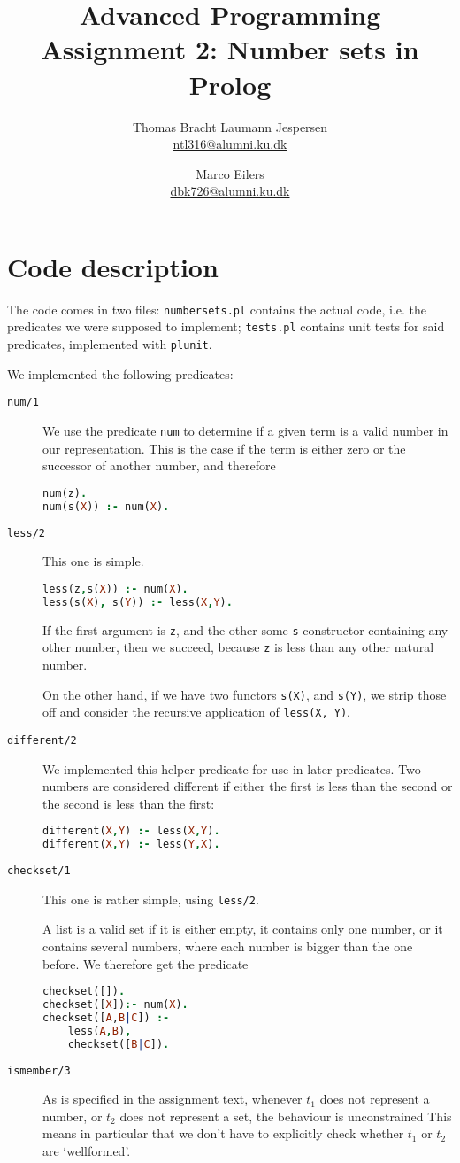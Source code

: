 \documentclass[a4paper]{article}
\title{Advanced Programming\\ Assignment 2: Number sets in Prolog}
\author{Thomas Bracht Laumann Jespersen\\ \url{ntl316@alumni.ku.dk} \and Marco Eilers\\ \url{dbk726@alumni.ku.dk} }
\newcommand{\pfuncn}[2]{\textnormal{\texttt{#1/#2}}\xspace}
\begin{document}
\maketitle
\section*{Code description}
The code comes in two files: \texttt{numbersets.pl} contains the actual code, i.e. the predicates we were supposed to implement; \texttt{tests.pl} contains unit tests for said predicates, implemented with \texttt{plunit}.

We implemented the following predicates:

\begin{description}
\item[\pfuncn{num}{1}] We use the predicate \texttt{num} to determine if a given term is a valid number in our representation. This is the case if the term is either zero or the successor of another number, and therefore
\begin{lstlisting}[language=prolog]
num(z).
num(s(X)) :- num(X).
\end{lstlisting}
\item[\pfuncn{less}{2}] This one is simple.
\begin{lstlisting}[language=prolog]
less(z,s(X)) :- num(X).
less(s(X), s(Y)) :- less(X,Y).
\end{lstlisting}
If the first argument is \texttt{z}, and the other some \texttt{s} constructor containing any other number, then we succeed, because \texttt{z} is less than any other natural number.

On the other hand, if we have two functors \texttt{s(X)}, and \texttt{s(Y)}, we strip those off and consider the recursive application of \texttt{less(X, Y)}.
\item[\pfuncn{different}{2}] We implemented this helper predicate for use in later predicates. Two numbers are considered different if either the first is less than the second or the second is less than the first:
\begin{lstlisting}[language=prolog]
different(X,Y) :- less(X,Y).
different(X,Y) :- less(Y,X).
\end{lstlisting}
\item[\pfuncn{checkset}{1}] This one is rather simple, using \pfuncn{less}{2}.

A list is a valid set if it is either empty, it contains only one number, or it contains several numbers, where each number is bigger than the one before.  We therefore get the predicate 
\begin{lstlisting}[language=prolog]
checkset([]).
checkset([X]):- num(X).
checkset([A,B|C]) :- 
	less(A,B), 
	checkset([B|C]).
\end{lstlisting}
\item[\pfuncn{ismember}{3}] As is specified in the assignment text, whenever $t_1$ does not represent a number, or $t_2$ does not represent a set, the behaviour is unconstrained %
  This means in particular that we don't have to explicitly check whether $t_1$ or $t_2$ are `wellformed'.


\end{description}
\end{document}
